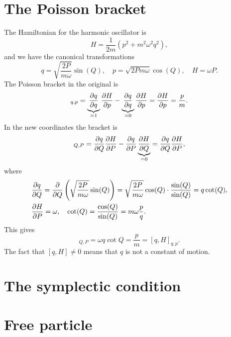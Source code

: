 \documentclass{article}
\begin{document}
    \section{The Poisson bracket}
    The Hamiltonian for the harmonic oscillator is
    \begin{equation*}
        H = \frac{1}{2m} \left(p^2 + m^2 \omega^2 q^2\right),
    \end{equation*}
    and we have the canonical transformations
    \begin{equation*}
        q = \sqrt{\frac{2P}{m \omega}} \sin(Q), \quad p = \sqrt{2 P m \omega} \cos(Q), \quad H = \omega P.
    \end{equation*}
    The Poisson bracket in the original is
    \begin{equation*}
        [q, H]_{q, p} = \underbrace{\pdv{q}{q}}_{=1}\pdv{H}{p} - \underbrace{\pdv{q}{q}}_{=0}\pdv{H}{p} = \pdv{H}{p} = \frac{p}{m}.
    \end{equation*} 
    In the new coordinates the bracket is
    \begin{equation*}
        [q, H]_{Q, P} = \pdv{q}{Q}\pdv{H}{P} - \pdv{q}{P} \underbrace{\pdv{H}{Q}}_{= 0} = \pdv{q}{Q}\pdv{H}{P},
    \end{equation*}
    where
    \begin{align*}
        & \pdv{q}{Q} = \pdv{Q}\left(\sqrt{\frac{2P}{m \omega}} \sin(Q)\right) = \sqrt{\frac{2P}{m \omega}} \cos(Q) \cdot \frac{\sin(Q)}{\sin(Q)} = q \cot(Q), \\
        & \pdv{H}{P} = \omega, \quad \cot(Q) = \frac{\cos(Q)}{\sin(Q)} = m \omega \frac{p}{q}.
    \end{align*}
    This gives 
    \begin{equation*}
        [q, H]_{Q, P} = \omega q \cot{Q} = \frac{p}{m} = [q, H]_{q, p}.
    \end{equation*}
    The fact that $[q, H] \neq 0$ means that $q$ is not a constant of motion.
    \section{The symplectic condition}
 
    \section{Free particle}
 
\end{document}
